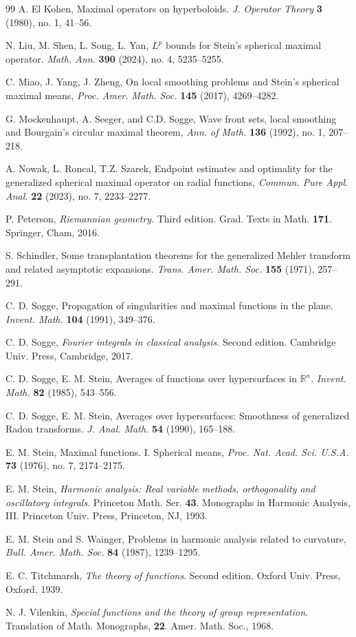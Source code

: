 \documentclass[11pt]{amsproc}
\newcommand{\0}{\mathbf{0}}
\numberwithin{equation}{section}
\numberwithin{figure}{section}
\theoremstyle{definition}
\theoremstyle{remark}
\numberwithin{thm}{section}
\begin{document}
\begin{thebibliography}{99}
A. El Kohen, Maximal operators on hyperboloids. \textit{J. Operator Theory} \textbf{3} (1980), no. 1, 41--56.

N. Liu, M. Shen, L. Song, L. Yan, $L^p$ bounds for Stein's spherical maximal operator. \textit{Math. Ann.} \textbf{390} (2024), no. 4, 5235--5255.

C. Miao, J. Yang, J. Zheng, On local smoothing problems and Stein's spherical maximal means, \textit{Proc. Amer. Math. Soc.} \textbf{145} (2017), 4269--4282.


 G. Mockenhaupt, A. Seeger, and C.D. Sogge,
Wave front sets, local smoothing and Bourgain's circular maximal theorem,
{\it Ann. of Math. } {\bf 136} (1992), no. 1, 207--218.


 A. Nowak, L. Roncal, T.Z. Szarek, Endpoint estimates and optimality for the generalized spherical maximal operator on radial functions,
{\it Commun. Pure Appl. Anal.} {\bf 22} (2023), no. 7, 2233--2277.

P. Peterson, \textit{Riemannian geometry}. Third edition. Grad. Texts in Math.  \textbf{171}. Springer, Cham, 2016.

S. Schindler, Some transplantation theorems for the generalized Mehler transform and related asymptotic expansions. \textit{Trans. Amer. Math. Soc.} \textbf{155} (1971), 257--291.



C. D. Sogge, Propagation of singularities and maximal functions in the plane. \textit{Invent. Math.} \textbf{104} (1991), 349--376.

C. D. Sogge, \textit{Fourier integrals in classical analysis}. Second edition. Cambridge Univ. Press, Cambridge, 2017.


C. D. Sogge, E. M. Stein,    Averages of functions over hypersurfaces in ${\mathbb R^n}$. {\it Invent. Math.} {\bf 82}  (1985),   543--556.

C. D. Sogge, E. M. Stein, Averages over hypersurfaces: Smoothness of generalized Radon transforms. \textit{J. Anal. Math.} \textbf{54} (1990), 165--188.


E. M. Stein, Maximal functions. I. Spherical means, \textit{Proc. Nat. Acad. Sci. U.S.A.} \textbf{73} (1976), no. 7, 2174--2175.

E. M. Stein, \textit{Harmonic analysis: Real variable methods, orthogonality and oscillatory integrals}. Princeton Math. Ser. \textbf{43}. Monographs in Harmonic Analysis, III. Princeton Univ. Press, Princeton, NJ, 1993.

 E. M. Stein and S. Wainger,
Problems in harmonic analysis related to curvature,
{\it Bull. Amer. Math. Soc.} {\bf 84} (1987), 1239--1295.


E. C. Titchmarsh, \textit{The theory of functions}. Second edition. Oxford Univ. Press, Oxford, 1939.


N. J. Vilenkin, \textit{Special functions and the theory of group representation}. Translation of Math. Monographs, \textbf{22}. Amer. Math. Soc., 1968.
\end{thebibliography}
\end{document}
